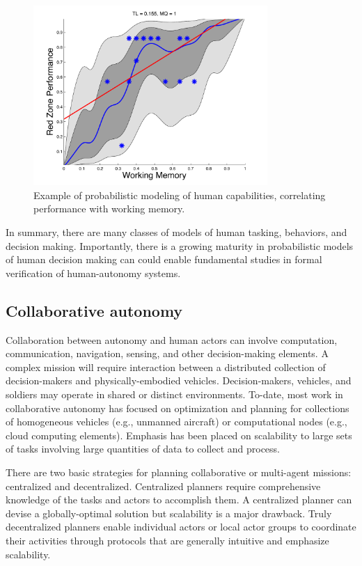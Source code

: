 \begin{figure}[h] 
   \centering
   \includegraphics[width=3.5in]{GP-fig.pdf} 
   \caption{Example of probabilistic modeling of human capabilities, correlating performance with working memory.}
   \label{fig:prob-humans}
\end{figure}

In summary, there are many classes of models of human tasking, behaviors, and decision making. Importantly, there is a growing maturity in probabilistic models of human decision making can could enable fundamental studies in formal verification of human-autonomy systems. 


\subsection*{Collaborative autonomy}


Collaboration between autonomy and human actors can involve
computation, communication, navigation, sensing, and other decision-making elements.  
A complex mission will require interaction between a distributed collection of decision-makers
and physically-embodied vehicles.  Decision-makers, vehicles, and soldiers may
operate in shared or distinct environments.  To-date, most work
in collaborative autonomy has focused on optimization and planning for collections of homogeneous
vehicles (e.g., unmanned aircraft) or computational nodes (e.g., cloud computing elements).  
Emphasis has been placed on scalability to large sets of tasks involving 
large quantities of data to collect and process.  

There are two basic strategies for planning collaborative or multi-agent missions:  
centralized and decentralized.  Centralized planners require 
comprehensive knowledge of the tasks and actors to accomplish them.  A centralized planner
can devise a globally-optimal solution but scalability is a major drawback.  Truly decentralized
planners enable individual actors or local actor groups to coordinate their activities through
protocols that are generally intuitive and emphasize scalability.

